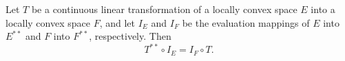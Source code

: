 Let $T$ be a continuous linear transformation of a locally convex space $E$ into a locally convex space $F$, and let $I_E$ and $I_F$ be the evaluation mappings of $E$ into $E^{**}$ and $F$ into $F^{**}$, respectively. Then
$$T^{**} \circ I_E = I_F \circ T.$$
